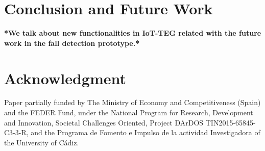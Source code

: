 \documentclass[conference]{IEEEtran}
\theoremstyle{definition}
\begin{document}
\section{Conclusion and Future Work}
\label{sec:conclusions}

\textbf{*We talk about new functionalities in IoT-TEG related with the future work in the fall detection prototype.*}

\section*{Acknowledgment}

Paper partially funded by The Ministry of Economy and Competitiveness (Spain) and the FEDER Fund, under the National Program for 
Research, Development and Innovation, Societal Challenges Oriented, Project DArDOS TIN2015-65845-C3-3-R, and the
Programa de Fomento e Impulso de la actividad Investigadora of the University of Cádiz.




\end{document}
